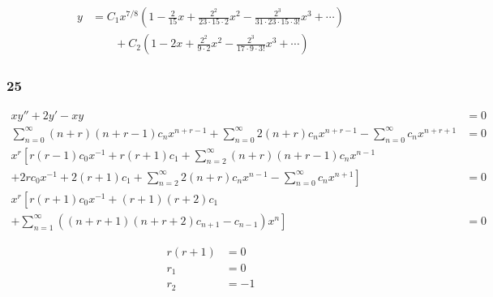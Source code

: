 \documentclass{article}
\begin{document}
\begin{align*}
  y & = C_1 x^{7 / 8} \left( 1 - \frac{2}{15} x + \frac{2^2}{23 \cdot 15 \cdot 2} x^2 - \frac{2^3}{31 \cdot 23 \cdot 15 \cdot 3!} x^3 + \cdots \right) \\
    & \qquad + C_2 \left( 1 - 2 x + \frac{2^2}{9 \cdot 2} x^2 - \frac{2^3}{17 \cdot 9 \cdot 3!} x^3 + \cdots \right)
\end{align*}

\subsubsection{25}

\begin{align*}
  x y'' + 2 y' - x y                                                                                                                                  & = 0 \\
  \sum_{n = 0}^\infty (n + r) (n + r - 1) c_n x^{n + r - 1} + \sum_{n = 0}^\infty 2 (n + r) c_n x^{n + r - 1} - \sum_{n = 0}^\infty c_n x^{n + r + 1} & = 0 \\
  x^r \left[ r (r - 1) c_0 x^{-1} + r (r + 1) c_1 + \sum_{n = 2}^\infty (n + r) (n + r - 1) c_n x^{n - 1} \qquad \right.                                    \\
  \left. + 2 r c_0 x^{-1} + 2 (r + 1) c_1 + \sum_{n = 2}^\infty 2 (n + r) c_n x^{n - 1} - \sum_{n = 0}^\infty c_n x^{n + 1} \right]                   & = 0 \\
  x^r \left[ r (r + 1) c_0 x^{-1} + (r + 1) (r + 2) c_1 \right. \qquad                                                                                &     \\
  \left. + \sum_{n = 1}^\infty \left( (n + r + 1) (n + r + 2) c_{n + 1} - c_{n - 1} \right) x^n \right]                                               & = 0
\end{align*}

\begin{align*}
  r (r + 1) & = 0  \\
  r_1       & = 0  \\
  r_2       & = -1
\end{align*}

\end{document}
